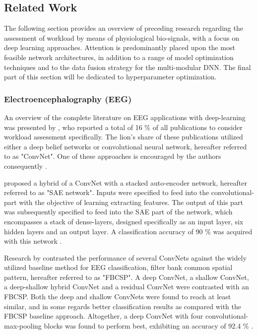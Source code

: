 \documentclass[12pt]{article}
\begin{document}
\subsection{Related Work} 
The following section provides an overview of preceding research regarding the assessment of workload by means of physiological bio-signals, with a focus on deep learning approaches. Attention is predominantly placed upon the most feasible network architectures, in addition to a range of model optimization techniques and to the data fusion strategy for the multi-modular DNN. The final part of this section will be dedicated to hyperparameter optimization.  

\subsubsection{Electroencephalography (EEG)}
An overview of the complete literature on EEG applications with deep-learning was presented by , who reported a total of 16 \% of all publications to consider workload assessment specifically. The lion's share of these publications utilized either a deep belief networks or convolutional neural network, hereafter referred to as "ConvNet". One of these approaches is encouraged by the authors consequently \cite{craik2019deep}.

 proposed a hybrid of a ConvNet with a stacked auto-encoder network, hereafter referred to as "SAE network". Inputs were specified to feed into the convolutional-part with the objective of learning extracting features. The output of this part was subsequently specified to feed into the SAE part of the network,  which encompasses a stack of dense-layers, designed specifically as an input layer, six hidden layers and an output layer. A classification accuracy of 90 \% was acquired with this network \cite{tabar2016novel}. 

Research by  contrasted the performance of several ConvNets against the widely utilized baseline method for EEG classification, filter bank common spatial pattern, hereafter referred to as "FBCSP". A deep ConvNet, a shallow ConvNet, a deep-shallow hybrid ConvNet and a residual ConvNet were contrasted with an FBCSP. Both the deep and shallow ConvNets were found to reach at least similar, and in some regards better classification results as compared with the FBCSP baseline approach. Altogether, a deep ConvNet with four convolutional-max-pooling blocks was found to perform best, exhibiting an accuracy of 92.4 \% \cite{schirrmeister2017deep}.
\end{document}
